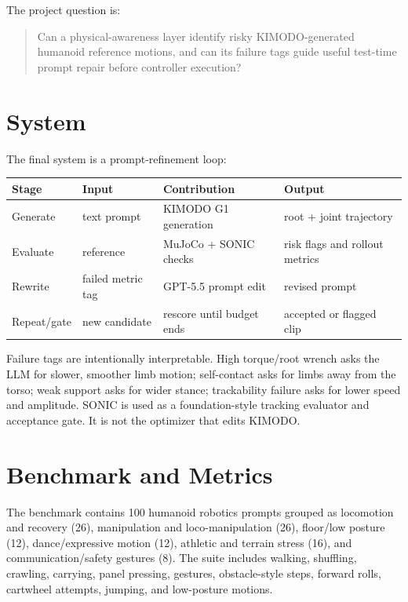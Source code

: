 \documentclass[10pt]{article}
\begin{document}
The project question is:
\begin{quote}
Can a physical-awareness layer identify risky KIMODO-generated humanoid
reference motions, and can its failure tags guide useful test-time prompt repair
before controller execution?
\end{quote}

\section{System}

The final system is a prompt-refinement loop:

\begin{center}
\begin{tabular}{llll}
\toprule
Stage & Input & Contribution & Output \\
\midrule
Generate & text prompt & KIMODO G1 generation & root + joint trajectory \\
Evaluate & reference & MuJoCo + SONIC checks & risk flags and rollout metrics \\
Rewrite & failed metric tag & GPT-5.5 prompt edit & revised prompt \\
Repeat/gate & new candidate & rescore until budget ends & accepted or flagged clip \\
\bottomrule
\end{tabular}
\end{center}

Failure tags are intentionally interpretable. High torque/root wrench asks the
LLM for slower, smoother limb motion; self-contact asks for limbs away from the
torso; weak support asks for wider stance; trackability failure asks for lower
speed and amplitude. SONIC is used as a foundation-style tracking evaluator and
acceptance gate. It is not the optimizer that edits KIMODO.

\section{Benchmark and Metrics}

The benchmark contains 100 humanoid robotics prompts grouped as locomotion and
recovery (26), manipulation and loco-manipulation (26), floor/low posture (12),
dance/expressive motion (12), athletic and terrain stress (16), and
communication/safety gestures (8). The suite includes walking, shuffling,
crawling, carrying, panel pressing, gestures, obstacle-style steps, forward
rolls, cartwheel attempts, jumping, and low-posture motions.
\end{document}
